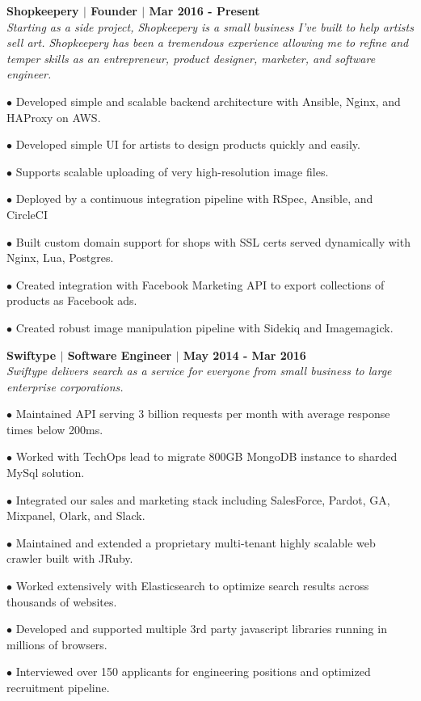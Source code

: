 \documentclass{article}
\begin{document}
	\begin{description}
	
	 \item \textbf{Shopkeepery $|$ Founder $|$ Mar 2016 - Present} \\
	 \textit{
	 Starting as a side project, Shopkeepery is a small business I've built to help artists sell art. 
	 Shopkeepery has been a tremendous experience allowing me to refine and temper skills as an entrepreneur, product designer, marketer, and software engineer.
	 }
	 
	 \item$\bullet$ Developed simple and scalable backend architecture with Ansible, Nginx, and HAProxy on AWS.
	 \item$\bullet$ Developed simple UI for artists to design products quickly and easily.
	 
	 \item$\bullet$ Supports scalable uploading of very high-resolution image files.
	 \item$\bullet$ Deployed by a continuous integration pipeline with RSpec, Ansible, and CircleCI
	 \item$\bullet$ Built custom domain support for shops with SSL certs served dynamically with Nginx, Lua, Postgres.
	 \item$\bullet$ Created integration with Facebook Marketing API to export collections of products as Facebook ads.
	 \item$\bullet$ Created robust image manipulation pipeline with Sidekiq and Imagemagick.
	
	 \item \textbf{Swiftype $|$ Software Engineer $|$ May 2014 - Mar 2016} \\
	 \textit{Swiftype delivers search as a service for everyone from small business to large enterprise corporations.}
	 
	 \item$\bullet$ Maintained API serving 3 billion requests per month with average response times below 200ms.
	 \item$\bullet$ Worked with TechOps lead to migrate 800GB MongoDB instance to sharded MySql solution.
	 \item$\bullet$ Integrated our sales and marketing stack including SalesForce, Pardot, GA, Mixpanel, Olark, and Slack.
	 \item$\bullet$ Maintained and extended a proprietary multi-tenant highly scalable web crawler built with JRuby.
	 \item$\bullet$ Worked extensively with Elasticsearch to optimize search results across thousands of websites.
	 \item$\bullet$ Developed and supported multiple 3rd party javascript libraries running in millions of browsers.
	 \item$\bullet$ Interviewed over 150 applicants for engineering positions and optimized recruitment pipeline. 
	

\end{description}
\end{document}
